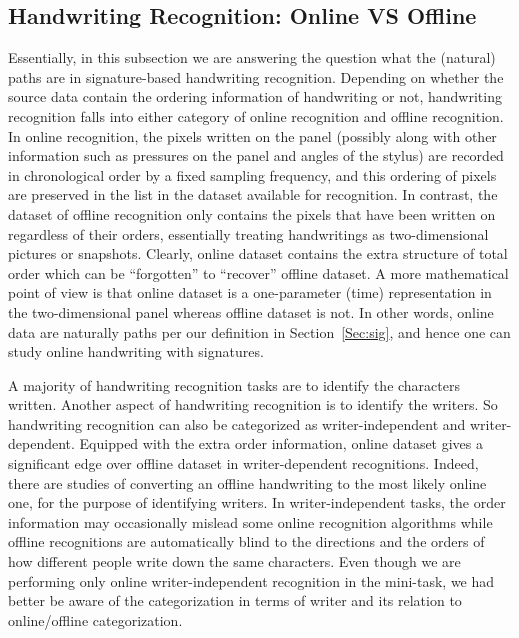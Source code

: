 \documentclass[fleqn]{article}
\theoremstyle{definition}
\theoremstyle{remark}
\begin{document}
\subsection{Handwriting Recognition: Online VS Offline}
Essentially, in this subsection we are answering the question what the (natural) paths are in signature-based handwriting recognition. Depending on whether the source data contain the ordering information of handwriting or not, handwriting recognition falls into either category of online recognition and offline recognition. In online recognition, the pixels written on the panel (possibly along with other information such as pressures on the panel and angles of the stylus) are recorded in chronological order by a fixed sampling frequency, and this ordering of pixels are preserved in the list in the dataset available for recognition. In contrast, the dataset of offline recognition only contains the pixels that have been written on regardless of their orders, essentially treating handwritings as two-dimensional pictures or snapshots. Clearly, online dataset contains the extra structure of total order which can be ``forgotten'' to ``recover'' offline dataset. A more mathematical point of view is that online dataset is a one-parameter (time) representation in the two-dimensional panel whereas offline dataset is not. In other words, online data are naturally paths per our definition in Section~\ref{Sec:sig}, and hence one can study online handwriting with signatures.

\par
A majority of handwriting recognition tasks are to identify the characters written. Another aspect of handwriting recognition is to identify the writers. So handwriting recognition can also be categorized as writer-independent and writer-dependent. Equipped with the extra order information, online dataset gives a significant edge over offline dataset in writer-dependent recognitions. Indeed, there are studies of converting an offline handwriting to the most likely online one, for the purpose of identifying writers. In writer-independent tasks, the order information may occasionally mislead some online recognition algorithms while offline recognitions are automatically blind to the directions and the orders of how different people write down the same characters. Even though we are performing only online writer-independent recognition in the mini-task, we had better be aware of the categorization in terms of writer and its relation to online/offline categorization.
\end{document}
